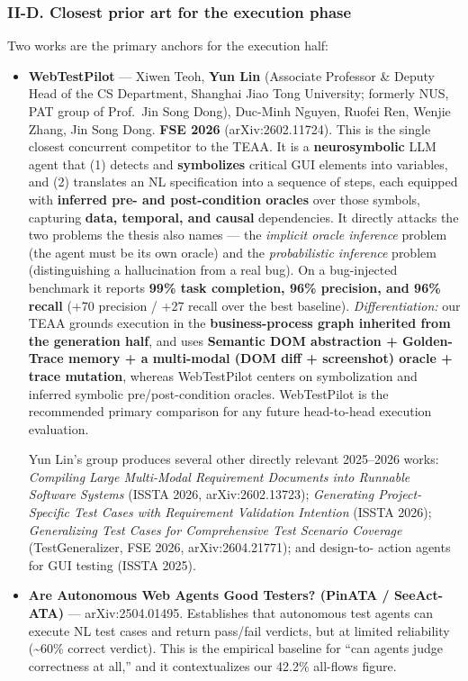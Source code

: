 \documentclass[
]{article}
\begin{document}
\subsubsection{II-D. Closest prior art for the execution
phase}\label{ii-d.-closest-prior-art-for-the-execution-phase}

Two works are the primary anchors for the execution half:

\begin{itemize}
\item
  \textbf{WebTestPilot} --- Xiwen Teoh, \textbf{Yun Lin} (Associate
  Professor \& Deputy Head of the CS Department, Shanghai Jiao Tong
  University; formerly NUS, PAT group of Prof.~Jin Song Dong), Duc-Minh
  Nguyen, Ruofei Ren, Wenjie Zhang, Jin Song Dong. \textbf{FSE 2026}
  (arXiv:2602.11724). This is the single closest concurrent competitor
  to the TEAA. It is a \textbf{neurosymbolic} LLM agent that (1) detects
  and \textbf{symbolizes} critical GUI elements into variables, and (2)
  translates an NL specification into a sequence of steps, each equipped
  with \textbf{inferred pre- and post-condition oracles} over those
  symbols, capturing \textbf{data, temporal, and causal} dependencies.
  It directly attacks the two problems the thesis also names --- the
  \emph{implicit oracle inference} problem (the agent must be its own
  oracle) and the \emph{probabilistic inference} problem (distinguishing
  a hallucination from a real bug). On a bug-injected benchmark it
  reports \textbf{99\% task completion, 96\% precision, and 96\% recall}
  (+70 precision / +27 recall over the best baseline).
  \emph{Differentiation:} our TEAA grounds execution in the
  \textbf{business-process graph inherited from the generation half},
  and uses \textbf{Semantic DOM abstraction + Golden-Trace memory + a
  multi-modal (DOM diff + screenshot) oracle + trace mutation}, whereas
  WebTestPilot centers on symbolization and inferred symbolic
  pre/post-condition oracles. WebTestPilot is the recommended primary
  comparison for any future head-to-head execution evaluation.

  Yun Lin's group produces several other directly relevant 2025--2026
  works: \emph{Compiling Large Multi-Modal Requirement Documents into
  Runnable Software Systems} (ISSTA 2026, arXiv:2602.13723);
  \emph{Generating Project-Specific Test Cases with Requirement
  Validation Intention} (ISSTA 2026); \emph{Generalizing Test Cases for
  Comprehensive Test Scenario Coverage} (TestGeneralizer, FSE 2026,
  arXiv:2604.21771); and design-to- action agents for GUI testing (ISSTA
  2025).
\item
  \textbf{Are Autonomous Web Agents Good Testers? (PinATA / SeeAct-ATA)}
  --- arXiv:2504.01495. Establishes that autonomous test agents can
  execute NL test cases and return pass/fail verdicts, but at limited
  reliability (\textasciitilde60\% correct verdict). This is the
  empirical baseline for ``can agents judge correctness at all,'' and it
  contextualizes our 42.2\% all-flows figure.
\end{itemize}
\end{document}
